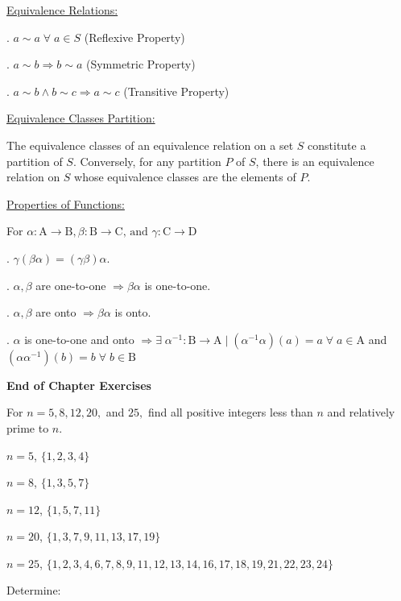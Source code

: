 \documentclass[11pt,largemargins]{homework}
\begin{document}
\underline{Equivalence Relations:}

. $a \sim a \;\forall\; a \in S$ (Reflexive Property)

. $a \sim b \Rightarrow b\sim a $ (Symmetric Property)

. $a\sim b \land b\sim c \Rightarrow a\sim c $ (Transitive Property)

\underline{Equivalence Classes Partition:}

\quad The equivalence classes of an equivalence relation on a set $S$ constitute a partition of $S$. Conversely, 
for any partition $P$ of $S$, there is an equivalence relation on $S$ whose equivalence classes are the 
elements of $P$.

\underline{Properties of Functions:}

For $\alpha: \text{A}\rightarrow\text{B},\beta: \text{B}\rightarrow\text{C}\text{, and }\gamma: \text{C}\rightarrow\text{D}$

. $\gamma(\beta\alpha) = (\gamma\beta)\alpha$.

. $\alpha, \beta$ are one-to-one $\Rightarrow \beta\alpha$ is one-to-one.

. $\alpha, \beta$ are onto $\Rightarrow \beta\alpha$ is onto.

. $\alpha$ is one-to-one and onto $\Rightarrow \exists\; \alpha^{-1}:\text{B}\rightarrow\text{A}\;|\;
(\alpha^{-1}\alpha)(a)=a \;\forall\; a \in \text{A}$ and $(\alpha\alpha^{-1})(b)=b \;\forall\; b \in \text{B}$

\hfill

\textbf{\large{End of Chapter Exercises}}

\question
For $n=5,8,12,20,$ and $25,$ find all positive integers less than $n$ and relatively prime to $n$.

\begin{alphaparts}
    \questionpart $n=5$,
    $\{1,2,3,4\}$

    \questionpart $n=8$,
    $\{1,3,5,7\}$

    \questionpart $n=12$,
    $\{1,5,7,11\}$

    \questionpart $n=20$,
    $\{1,3,7,9,11,13,17,19\}$

    \questionpart $n=25$,
    $\{1,2,3,4,6,7,8,9,11,12,13,14,16,17,18,19,21,22,23,24\}$

\end{alphaparts}

\question 
Determine: 
\end{document}
